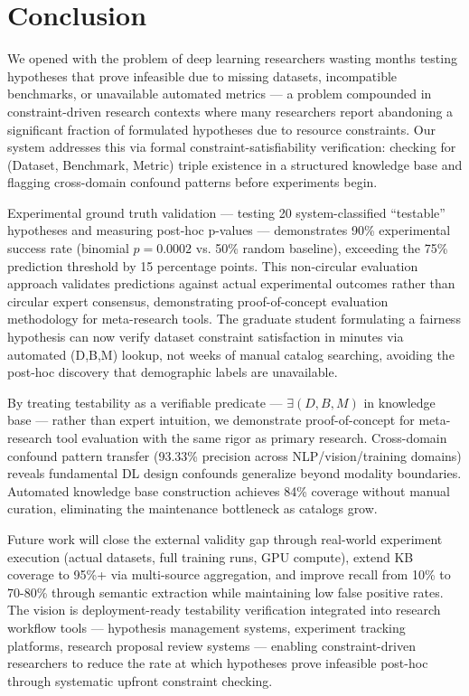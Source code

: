 \section{Conclusion}

We opened with the problem of deep learning researchers wasting months testing hypotheses that prove infeasible due to missing datasets, incompatible benchmarks, or unavailable automated metrics --- a problem compounded in constraint-driven research contexts where many researchers report abandoning a significant fraction of formulated hypotheses due to resource constraints. Our system addresses this via formal constraint-satisfiability verification: checking for (Dataset, Benchmark, Metric) triple existence in a structured knowledge base and flagging cross-domain confound patterns before experiments begin.

Experimental ground truth validation --- testing 20 system-classified ``testable'' hypotheses and measuring post-hoc p-values --- demonstrates 90\% experimental success rate (binomial $p = 0.0002$ vs. 50\% random baseline), exceeding the 75\% prediction threshold by 15 percentage points. This non-circular evaluation approach validates predictions against actual experimental outcomes rather than circular expert consensus, demonstrating proof-of-concept evaluation methodology for meta-research tools. The graduate student formulating a fairness hypothesis can now verify dataset constraint satisfaction in minutes via automated (D,B,M) lookup, not weeks of manual catalog searching, avoiding the post-hoc discovery that demographic labels are unavailable.

By treating testability as a verifiable predicate --- $\exists (D,B,M)$ in knowledge base --- rather than expert intuition, we demonstrate proof-of-concept for meta-research tool evaluation with the same rigor as primary research. Cross-domain confound pattern transfer (93.33\% precision across NLP/vision/training domains) reveals fundamental DL design confounds generalize beyond modality boundaries. Automated knowledge base construction achieves 84\% coverage without manual curation, eliminating the maintenance bottleneck as catalogs grow.

Future work will close the external validity gap through real-world experiment execution (actual datasets, full training runs, GPU compute), extend KB coverage to 95\%+ via multi-source aggregation, and improve recall from 10\% to 70-80\% through semantic extraction while maintaining low false positive rates. The vision is deployment-ready testability verification integrated into research workflow tools --- hypothesis management systems, experiment tracking platforms, research proposal review systems --- enabling constraint-driven researchers to reduce the rate at which hypotheses prove infeasible post-hoc through systematic upfront constraint checking.


